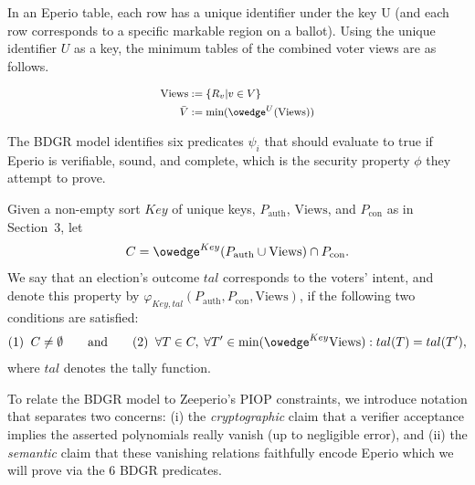 In an Eperio table, each row has a unique identifier under the key U (and each row corresponds to a specific markable region on a ballot). Using the unique identifier $U$ as a key, the minimum tables of the combined voter views are as follows. 

\begin{mdframed}[linewidth=0.6pt,backgroundcolor=verylightblue,innerleftmargin=6pt,innerrightmargin=6pt,innertopmargin=4pt,innerbottommargin=4pt]
\[
\footnotesize
\begin{aligned}
\mathrm{Views}&:=\{R_v|v\in V\}\\
\bar{V}&:=\min(\owedge^{U}(\mathrm{Views}))\\
\end{aligned}
\]
\end{mdframed}


The BDGR model identifies six predicates $\psi_i$ that should evaluate to true if Eperio is verifiable, sound, and complete, which is the security property $\phi$ they attempt to prove.

\begin{mdframed}[linewidth=0.6pt,backgroundcolor=verylightblue,innerleftmargin=6pt,innerrightmargin=6pt,innertopmargin=4pt,innerbottommargin=4pt,nobreak=true]
\begin{definition}
\label{def:bdgr}
Given a non-empty sort $Key$ of unique keys, $P_{\mathrm{auth}}$, $\mathrm{Views}$, and $P_{\mathrm{con}}$ as in Section~3, let
\[
C = \owedge^{Key}(P_{\mathrm{auth}}\cup \mathrm{Views}) \cap P_{\mathrm{con}}.
\]
We say that an election’s outcome $tal$ corresponds to the voters’ intent, and denote this property by
$\varphi_{Key,tal}(P_{\mathrm{auth}},P_{\mathrm{con}},\mathrm{Views})$, if the following two conditions are satisfied:
\[
(1)\;\; C \neq \emptyset
\qquad\text{and}\qquad
(2)\;\; \forall T \in C,\; \forall T' \in \min(\owedge^{Key}\mathrm{Views}) : tal(T) = tal(T'),
\]
where $tal$ denotes the tally function.
\end{definition}
\end{mdframed}

To relate the BDGR model to Zeeperio's PIOP constraints, we introduce notation that separates two concerns:
(i) the \emph{cryptographic} claim that a verifier acceptance implies the asserted polynomials really vanish (up to negligible error), and
(ii) the \emph{semantic} claim that these vanishing relations faithfully encode Eperio which we will prove via the 6 BDGR predicates.

